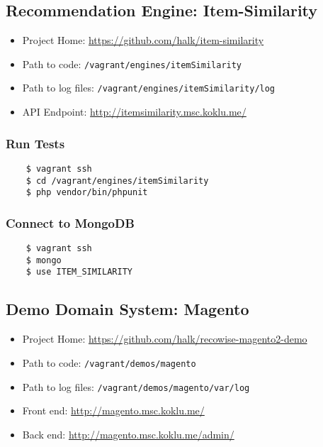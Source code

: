 \subsection{Recommendation Engine: Item-Similarity}

\begin{itemize}
\item Project Home: \url{https://github.com/halk/item-similarity}
\item Path to code: \texttt{/vagrant/engines/itemSimilarity}
\item Path to log files: \texttt{/vagrant/engines/itemSimilarity/log}
\item API Endpoint: \url{http://itemsimilarity.msc.koklu.me/}
\end{itemize}

\subsubsection{Run Tests}

\begin{verbatim}
    $ vagrant ssh
    $ cd /vagrant/engines/itemSimilarity
    $ php vendor/bin/phpunit
\end{verbatim}

\subsubsection{Connect to MongoDB}

\begin{verbatim}
    $ vagrant ssh
    $ mongo
    $ use ITEM_SIMILARITY
\end{verbatim}



\subsection{Demo Domain System: Magento}

\begin{itemize}
\item Project Home: \url{https://github.com/halk/recowise-magento2-demo}
\item Path to code: \texttt{/vagrant/demos/magento}
\item Path to log files: \texttt{/vagrant/demos/magento/var/log}
\item Front end: \url{http://magento.msc.koklu.me/}
\item Back end: \url{http://magento.msc.koklu.me/admin/}
\end{itemize}

